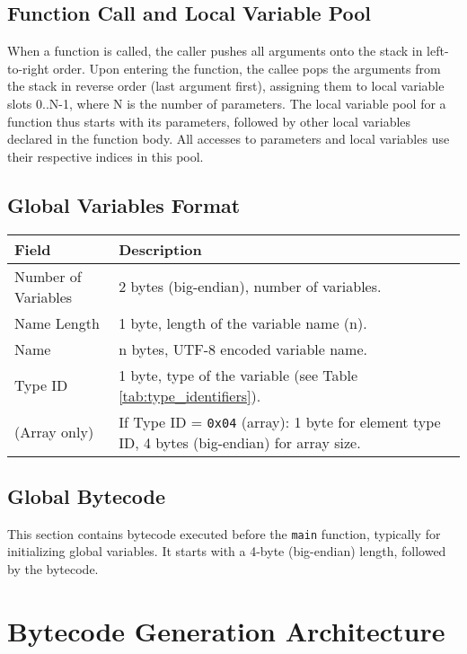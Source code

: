 \documentclass[a4paper,12pt]{article}
\begin{document}
    \subsection{Function Call and Local Variable Pool}
    When a function is called, the caller pushes all arguments onto the stack in left-to-right order. Upon entering the function, the callee pops the arguments from the stack in reverse order (last argument first), assigning them to local variable slots 0..N-1, where N is the number of parameters. The local variable pool for a function thus starts with its parameters, followed by other local variables declared in the function body. All accesses to parameters and local variables use their respective indices in this pool.

    \subsection{Global Variables Format}
    \begin{tabular}{|l|p{9cm}|}
        \hline
        \textbf{Field} & \textbf{Description} \\ \hline
        Number of Variables & 2 bytes (big-endian), number of variables. \\ \hline
        Name Length & 1 byte, length of the variable name (n). \\ \hline
        Name & n bytes, UTF-8 encoded variable name. \\ \hline
        Type ID & 1 byte, type of the variable (see Table \ref{tab:type_identifiers}). \\ \hline
        (Array only) & If Type ID = \texttt{0x04} (array): 1 byte for element type ID, 4 bytes (big-endian) for array size. \\ \hline
    \end{tabular}
    \label{tab:global_variables_format}

    \subsection{Global Bytecode}
    This section contains bytecode executed before the \texttt{main} function, typically for initializing global variables. It starts with a 4-byte (big-endian) length, followed by the bytecode.

    \section{Bytecode Generation Architecture}
\end{document}
